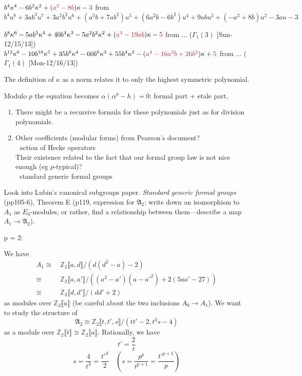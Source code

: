 \documentclass{rs}
\theoremstyle{definition}
\theoremstyle{remark}
\newcommand{\mb}[1]{\mathbb{#1}}
\newcommand{\mf}[1]{\mathfrak{#1}}
\newcommand{\BZ}{{\mb Z}}
\newcommand{\A}{\alpha}
\newcommand{\G}{\Gamma}
\newcommand{\K}{\kappa}
\newcommand{\lb}{\llbracket}
\newcommand{\rb}{\rrbracket}
\renewcommand{\=}{\approx}
\renewcommand{\-}{\sim}
\numberwithin{equation}{section}
\numberwithin{thm}{section}
\begin{document}
$b^4 \K^4 - 6 b^2 \K^2 + (\textcolor{Maroon}{a^2 - 8 b}) \K - \textcolor{Maroon}{3}$ 
from $b^4 u^8 + 3 a b^3 u^7 + 3 a^2 b^2 u^6 + (a^3 b + 7 a b^2) u^5 + (6 a^2 b - 6 b^2) u^4 + 9 a b u^3 + (-a^2 + 8 b) u^2 - 3 a u - 3$ 

$b^8 \K^6 - 5 a b^5 \K^4 + 40 b^4 \K^3 - 5 a^2 b^2 \K^2 + (\textcolor{Maroon}{a^4 - 19 a b}) \K - \textcolor{Maroon}{5}$ 
from $\ldots$ ($\G_1(3)$ [Sun-12/15/13]) \\
$b^{12} \K^6 - 10 b^{10} \K^5 + 35 b^8 \K^4 - 60 b^6 \K^3 + 55 b^4 \K^2 - (\textcolor{Maroon}{a^4 - 16 a^2 b + 26 b^2}) \K + \textcolor{Maroon}{5}$ 
from $\ldots$ ($\G_1(4)$ [Mon-12/16/13]) 

The definition of $\K$ as a norm relates it to only the highest symmetric polynomial.  

Modulo $p$ the equation becomes $\A (\A^p - h) = 0$: formal part + etale part.  

\begin{enumerate}[\bf {Possibility} 1]
 \item There might be a recursive formula for these polynomials just as for division polynomials.  

 \item Other coefficients (modular forms) from Pearson's document?  \\
 \textcolor{white}{.} \hfill action of Hecke operators \\
 Their existence related to the fact that our formal group law is not nice enough (eg $p$-typical)?  \\
 \textcolor{white}{.} \hfill standard generic formal groups 
\end{enumerate}

Look into Lubin's canonical subgroups paper.  
{\em Standard generic formal groups} (pp105-6), 
Theorem E (p119, expression for $\mf A_2$: 
write down an isomorphism to $A_1$ as $E_0$-modules, 
or rather, find a relationship between them---describe a map $A_1 \to \mf A_2$).  

p = 2: 

We have 
\begin{equation*}
\begin{split}
 A_1 \cong & ~ \BZ_2 \lb a, d \rb / (d (d^2 - a) - 2) \\
     \cong & ~ \BZ_2 \lb a, a' \rb / ((a^2 - a') (a - a'^2) + 2 (5 a a' - 27)) \\
     \cong & ~ \BZ_2 \lb d, d' \rb / (d d' + 2) 
\end{split}
\end{equation*}
as modules over $\BZ_2 \lb a \rb$ (be careful about the two inclusions $A_0 \to A_1$).  
We want to study the structure of 
\[
 \mf A_2 \cong \BZ_2 \lb t, t', s \rb / (t t' - 2, t^3 s - 4) 
\]
as a module over $\BZ_2 \lb t \rb \cong \BZ_2 \lb a \rb$.  
Rationally, we have 
\[
 t' = \frac{2}{t} 
\]
\[
 s = \frac{4}{t^3} = \frac{t'^3}{2} \quad \left( s = \frac{p^p}{t^{p+1}} = \frac{t'^{p+1}}{p} \right) 
\]
\end{document}
